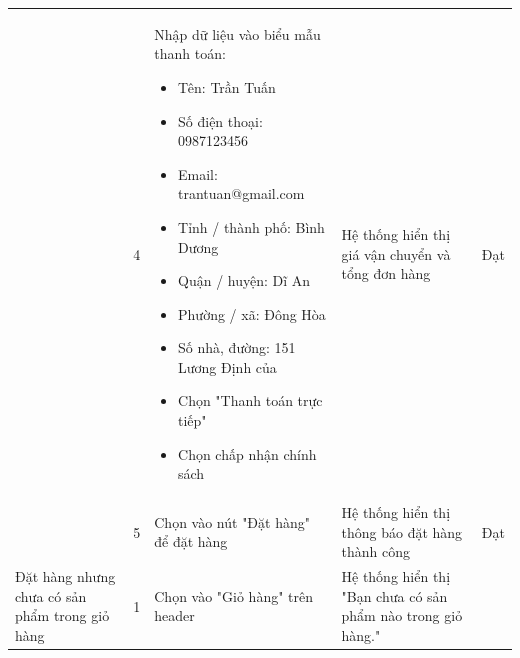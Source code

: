 {\begin{longtable}{| p{2.5cm}| p{1cm}| p{5.5cm}| p{4.5cm} | p{1.5cm} |}
        \cline{2-5}
                                                                                                        & 4                  &
        Nhập dữ liệu vào biểu mẫu thanh toán:
        \begin{itemize}
            \item Tên: Trần Tuấn
            \item Số điện thoại: 0987123456
            \item Email: trantuan@gmail.com
            \item Tỉnh / thành phố: Bình Dương
            \item Quận / huyện: Dĩ An
            \item Phường / xã: Đông Hòa
            \item Số nhà, đường: 151 Lương Định của
            \item Chọn "Thanh toán trực tiếp"
            \item Chọn chấp nhận chính sách
        \end{itemize}
                                                                                                        &
        Hệ thống hiển thị giá vận chuyển và tổng đơn hàng                                               &
        Đạt                                                                                                                                                                                            \\
        \cline{2-5}
                                                                                                        & 5                  &
        Chọn vào nút "Đặt hàng" để đặt hàng                                                             &
        Hệ thống hiển thị thông báo đặt hàng thành công                                                 &
        Đạt                                                                                                                                                                                            \\
        \hline
        \multirow[t]{2}{2.5cm}{Đặt hàng nhưng chưa có sản phẩm trong giỏ hàng}                          &
        1                                                                                               &
        Chọn vào "Giỏ hàng" trên header                                                                 &
        Hệ thống hiển thị "Bạn chưa có sản phẩm nào trong giỏ hàng."                                    &

\end{longtable}}
